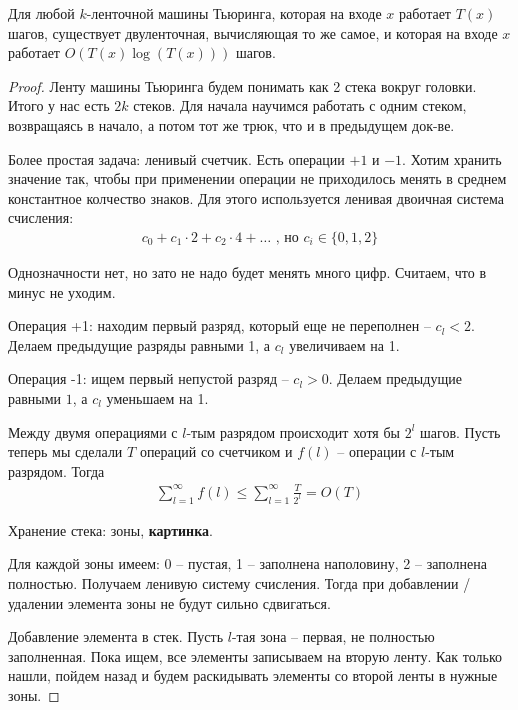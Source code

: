 \begin{theorem}
    Для любой $k$-ленточной машины Тьюринга, которая на входе $x$ работает $T(x)$ шагов, существует двуленточная, вычисляющая то же самое, и которая на входе $x$ работает $O(T(x)\log(T(x)))$ шагов.
\end{theorem}
\begin{proof}
    Ленту машины Тьюринга будем понимать как 2 стека вокруг головки. Итого у нас есть $2k$ стеков.
    Для начала научимся работать с одним стеком, возвращаясь в начало, а потом тот же трюк, что и в предыдущем док-ве.
 
    Более простая задача: ленивый счетчик. Есть операции $+1$ и $-1$. Хотим хранить значение так, чтобы при применении операции не приходилось менять в среднем константное колчество знаков. 
    Для этого используется ленивая двоичная система счисления: 
    \begin{gather*}
      c_0 + c_1 \cdot 2 + c_2 \cdot 4 + \dots \text{ , но } c_i \in \{0, 1, 2\}
    \end{gather*}

    Однозначности нет, но зато не надо будет менять много цифр. Считаем, что в минус не уходим. 
 
    Операция +1: находим первый разряд, который еще не переполнен -- $c_l < 2$. Делаем предыдущие разряды равными 1, а $c_l$ увеличиваем на 1.
 
    Операция -1: ищем первый непустой разряд -- $c_l > 0$. Делаем предыдущие равными $1$, а $c_l$ уменьшаем на 1.
 
    Между двумя операциями с $l$-тым разрядом происходит хотя бы $2^l$ шагов. Пусть теперь мы сделали $T$ операций со счетчиком и $f(l)$ -- операции с $l$-тым разрядом. Тогда \begin{gather*}
        \sum_{l=1}^\infty f(l) \leqslant \sum_{l=1}^\infty \frac{T}{2^l} = O(T)
    \end{gather*}
 
    Хранение стека: зоны, \textbf{картинка}.
 
    Для каждой зоны имеем: 0 -- пустая, 1 -- заполнена наполовину, 2 -- заполнена полностью. Получаем ленивую систему счисления. Тогда при добавлении / удалении элемента зоны не будут сильно сдвигаться.
 
    Добавление элемента в стек. Пусть $l$-тая зона -- первая, не полностью заполненная. Пока ищем, все элементы записываем на вторую ленту. Как только нашли, пойдем назад и будем раскидывать элементы со второй ленты в нужные зоны.
 

\end{proof}
